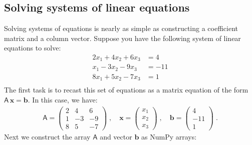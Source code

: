 \documentclass[letterpaper,10pt,english]{sphinxmanual}
\begin{document}
\subsection{Solving systems of linear equations}
\label{\detokenize{chap9/chap9_scipy:solving-systems-of-linear-equations}}\label{\detokenize{chap9/chap9_scipy:index-7}}
\sphinxAtStartPar
Solving systems of equations is nearly as simple as constructing a coefficient matrix and a column vector.  Suppose you have the following system of linear equations to solve:
\begin{equation*}
\begin{split}2x_1 + 4x_2 + 6x_3 &= 4\\
 x_1 - 3x_2 - 9x_3 &= -11\\
8x_1 + 5x_2 - 7x_3 &= 1\\\end{split}
\end{equation*}
\sphinxAtStartPar
The first task is to recast this set of equations as a matrix equation of the form \(\mathsf{A}\, \mathbf{x} = \mathbf{b}\).  In this  case, we have:
\begin{equation*}
\begin{split}\mathsf{A} = \left(\begin{array}{ccc}2 &  4 &  6 \\
                                     1 & -3 & -9 \\
                                     8 &  5 & -7 \end{array}\right)
                                     \;,\quad
\mathbf{x} = \left(\begin{array}{c}x_1 \\x_2 \\x_3\end{array}\right)
                                     \;,\quad
\mathbf{b} = \left(\begin{array}{c}4 \\-11 \\1\end{array}\right) \;.\end{split}
\end{equation*}
\sphinxAtStartPar
Next we construct the array \(\mathsf{A}\) and vector \(\mathbf{b}\) as NumPy arrays:

\begin{sphinxVerbatim}[commandchars=\\\{\}]
  \PYG{p}{[}\PYG{p}{[}  \PYG{p}{]} \PYG{p}{[}  \PYG{p}{]} \PYG{p}{[}  \PYG{p}{]}\PYG{p}{]}
  \PYG{p}{[}  \PYG{p}{]}
\end{sphinxVerbatim}
\end{document}
